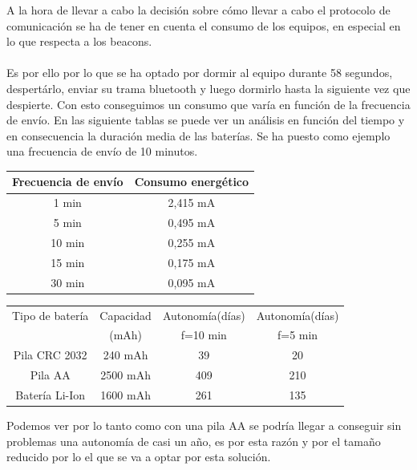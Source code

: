 \documentclass[paper=a4, fontsize=11pt,twoside]{scrartcl}	%
\begin{document}
            A la hora de llevar a cabo la decisión sobre cómo llevar a cabo el protocolo de comunicación se ha de tener en cuenta 
            el consumo de los equipos, en especial en lo que respecta a los beacons.
            \paragraph{}
            Es por ello por lo que se ha optado por dormir al equipo durante 58 segundos, despertárlo,
            enviar su trama bluetooth y luego dormirlo hasta la siguiente vez que despierte.
            Con esto conseguimos un consumo que varía en función de la frecuencia de envío. En las siguiente tablas
            se puede ver un análisis en función del tiempo y en consecuencia la duración media de las baterías.
            Se ha puesto como ejemplo una frecuencia de envío de 10 minutos.
            \begin{center}
                \begin{tabular}{||c || c ||} 
                \hline
                Frecuencia de envío  & Consumo energético  \\ [0.5ex] 
                \hline
                1 min &  2,415 mA \\
                5 min &  0,495 mA \\ 
                10 min &  0,255 mA \\ 
                15 min &  0,175 mA \\ 
                30 min &  0,095 mA \\ 
                \hline
                \end{tabular}
            \end{center}
            \begin{center}
                \begin{tabular}{|c | c| c| c |} 
                \hline
                    Tipo de batería & Capacidad  & Autonomía(días) & Autonomía(días)   \\ [0.5ex] 
                    & (mAh) &  f=10 min &  f=5 min   \\ [0.5ex] 
                \hline
                \hline
                    Pila CRC 2032 &  240 mAh  & 39   & 20 \\ 
                    Pila AA       &  2500 mAh & 409  & 210 \\ 
                    Batería Li-Ion&  1600 mAh & 261  & 135 \\ 
                \hline
                \end{tabular}
            \end{center}
            Podemos ver por lo tanto como con una pila AA se podría llegar a conseguir sin problemas una autonomía de casi un 
            año, es por esta razón y por el tamaño reducido por lo el que se va a optar por esta solución.
            
\end{document}
